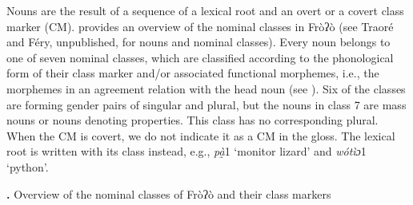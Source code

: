 Nouns are the result of a sequence of a lexical root and an overt or a covert class marker (CM).  provides an overview of the nominal classes in Fròʔò (see Traoré and Féry, unpublished, for nouns and nominal classes). Every noun belongs to one of seven nominal classes, which are classified according to the phonological form of their class marker and/or associated functional morphemes, i.e., the morphemes in an agreement relation with the head noun (see \citealt{Corbett1991}). Six of the classes are forming gender pairs of singular and plural, but the nouns in class 7 are mass nouns or nouns denoting properties. This class has no corresponding plural. When the CM is covert, we do not indicate it as a CM in the gloss. The lexical root is written with its class instead, e.g., \textit{pà̰}1 ‘monitor lizard’ and \textit{wótìɔ}1 ‘python’.

\textbf{.} Overview of the nominal classes of Fròʔò and their class markers

